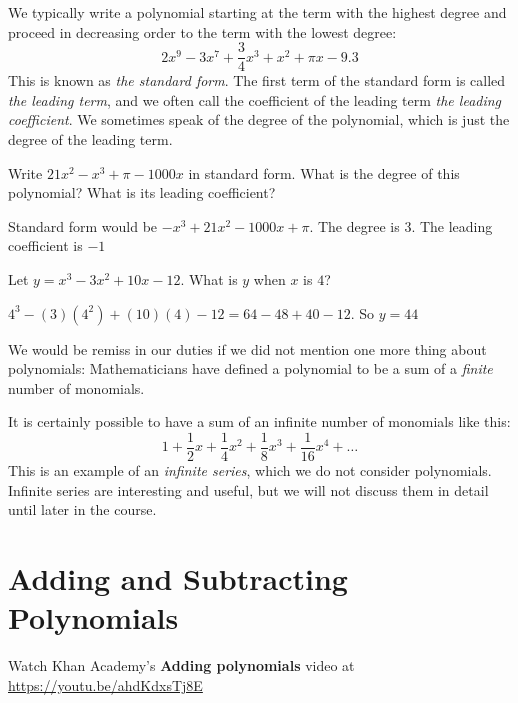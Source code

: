 We typically write a polynomial starting at the term with the highest
degree and proceed in decreasing order to the term with the lowest
degree:
\begin{equation*}
2 x^9 - 3x^7 + \frac{3}{4}x^3 + x^2 + \pi x -9.3
\end{equation*}
This is known as \emph{the standard form}.  The first term of the
standard form is called \emph{the leading term}, and we often call the
coefficient of the leading term \emph{the leading coefficient}.  We
sometimes speak of the degree of the polynomial, which is just the
degree of the leading term.

\begin{Exercise}[title={Standard of a Polynomial}, label=polynomialstandardform]
  Write $21x^2 - x^3 + \pi - 1000x$ in standard form. What is the degree of this polynomial? What is its leading coefficient?
\end{Exercise}
\begin{Answer}[ref=polynomialstandardform]
  Standard form would be $-x^3 + 21x^2 - 1000x + \pi$. The degree is 3. The leading coefficient is $-1$
\end{Answer}

\begin{Exercise}[title={Evaluate a Polynomial}, label=evaluatepolynomial]
  Let $y = x^3 - 3x^2 + 10x - 12$. What is $y$ when $x$ is $4$?
\end{Exercise}
\begin{Answer}[ref=evaluatepolynomial]
  $4^3 - (3)(4^2) + (10)(4) - 12 = 64 - 48 + 40 - 12$. So $y = 44$ 
\end{Answer}

We would be remiss in our duties if we did not mention one more thing
about polynomials: Mathematicians have defined a polynomial to be a sum
of a \emph{finite} number of monomials.

It is certainly possible to have a sum of an infinite number of monomials
like this:
\begin{equation*}
1 + \frac{1}{2}x + \frac{1}{4}x^2 + \frac{1}{8}x^3 + \frac{1}{16}x^4 + \ldots
\end{equation*}
This is an example of an \emph{infinite series}, which we do not consider
polynomials. Infinite series are interesting and useful, but we 
will not discuss them in detail until later in the course.


\section{Adding and Subtracting Polynomials}
Watch Khan Academy's \textbf{Adding polynomials} video at \url{https://youtu.be/ahdKdxsTj8E}

